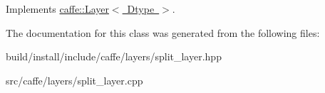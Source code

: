 Implements \mbox{\hyperlink{classcaffe_1_1_layer_a7fe981e8af8d93d587acf2a952be563d}{caffe\+::\+Layer$<$ Dtype $>$}}.



The documentation for this class was generated from the following files\+:\begin{DoxyCompactItemize}
\item 
build/install/include/caffe/layers/split\+\_\+layer.\+hpp\item 
src/caffe/layers/split\+\_\+layer.\+cpp\end{DoxyCompactItemize}
